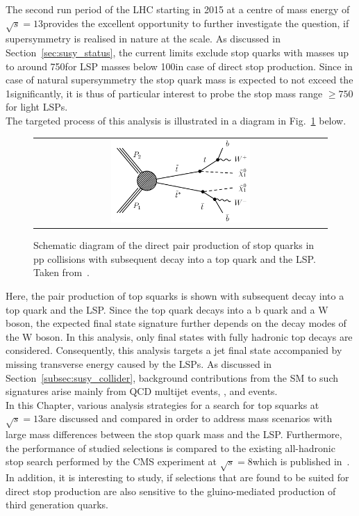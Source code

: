The second run period of the LHC starting in 2015 at a centre of mass energy of $\sqrt{s} = 13$\tev provides the excellent opportunity to further investigate the question, if supersymmetry is realised in nature at the \tev scale. As discussed in Section~\ref{sec:susy_status}, the current limits exclude stop quarks with masses up to around 750\gev for LSP masses below 100\gev in case of direct stop production. Since in case of natural supersymmetry the stop quark mass is expected to not exceed the 1\tev significantly, it is thus of particular interest to probe the stop mass range $\ge 750$\gev for light LSPs. \\
The targeted process of this analysis is illustrated in a diagram in Fig.~\ref{fig:T2tt} below. \\ 
\begin{figure}[!h]
  \centering
  \begin{tabular}{c}
                \includegraphics[width=0.49\textwidth]{figures/T2tt.pdf} 
  \end{tabular}
  \caption{Schematic diagram of the direct pair production of stop quarks in pp collisions with subsequent decay into a top quark and the LSP. Taken from~\cite{bib:CMS:PhysicsResultsSUS}. }
  \label{fig:T2tt}
\end{figure}
   
Here, the pair production of top squarks is shown with subsequent decay into a top quark and the LSP. Since the top quark decays into a b quark and a W boson, the expected final state signature further depends on the decay modes of the W boson. In this analysis, only final states with fully hadronic top decays are considered. Consequently, this analysis targets a jet final state accompanied by missing transverse energy caused by the LSPs. As discussed in Section~\ref{subsec:susy_collider}, background contributions from the SM to such signatures arise mainly from QCD multijet events, \WJets, \ZJets and \ttbar events. \\
In this Chapter, various analysis strategies for a search for top squarks at $\sqrt{s} = 13$\tev are discussed and compared in order to address mass scenarios with large mass differences between the stop quark mass and the LSP. Furthermore, the performance of studied selections is compared to the existing all-hadronic stop search performed by the CMS experiment at $\sqrt{s} = 8$\tev which is published in~\cite{CMS-PAS-SUS-13-015}. In addition, it is interesting to study, if selections that are found to be suited for direct stop production are also sensitive to the gluino-mediated production of third generation quarks. \\

